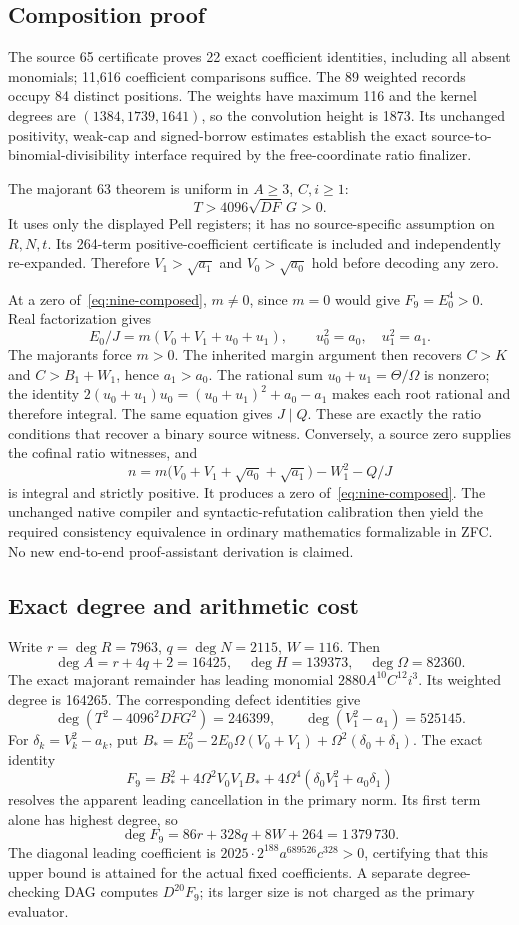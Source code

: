 \subsection{Composition proof}
The source 65 certificate proves 22 exact coefficient identities, including
all absent monomials; 11,616 coefficient comparisons suffice. The 89 weighted
records occupy 84 distinct positions. The weights have maximum 116 and the
kernel degrees are $(1384,1739,1641)$, so the convolution height is 1873.
Its unchanged positivity, weak-cap and signed-borrow estimates establish
the exact source-to-binomial-divisibility interface required by the
free-coordinate ratio finalizer.

The majorant 63 theorem is uniform in $A\ge3$, $C,i\ge1$:
\[
 T>4096\sqrt{DF}\,G>0.
\]
It uses only the displayed Pell registers; it has no source-specific
assumption on $R,N,t$. Its 264-term positive-coefficient certificate is
included and independently re-expanded. Therefore $V_1>\sqrt{a_1}$ and
$V_0>\sqrt{a_0}$ hold before decoding any zero.

At a zero of~\eqref{eq:nine-composed}, $m\ne0$, since $m=0$ would give
$F_9=E_0^4>0$. Real factorization gives
\[
 E_0/J=m(V_0+V_1+u_0+u_1),\qquad u_0^2=a_0,\quad u_1^2=a_1.
\]
The majorants force $m>0$. The inherited margin argument then recovers
$C>K$ and $C>B_1+W_1$, hence $a_1>a_0$. The rational sum
$u_0+u_1=\Theta/\Omega$ is nonzero; the identity
$2(u_0+u_1)u_0=(u_0+u_1)^2+a_0-a_1$ makes each root rational and therefore
integral. The same equation gives $J\mid Q$. These are exactly the ratio
conditions that recover a binary source witness. Conversely, a source zero
supplies the cofinal ratio witnesses, and
\[
 n=m\bigl(V_0+V_1+\sqrt{a_0}+\sqrt{a_1}\bigr)-W_1^2-Q/J
\]
is integral and strictly positive. It produces a zero of~\eqref{eq:nine-composed}.
The unchanged native compiler and syntactic-refutation calibration then yield
the required consistency equivalence in ordinary mathematics formalizable
in ZFC. No new end-to-end proof-assistant derivation is claimed.

\subsection{Exact degree and arithmetic cost}
Write $r=\deg R=7963$, $q=\deg N=2115$, $W=116$. Then
\[
 \deg A=r+4q+2=16425,\quad\deg H=139373,\quad\deg\Omega=82360.
\]
The exact majorant remainder has leading monomial
$2880A^{10}C^{12}i^3$. Its weighted degree is 164265. The corresponding
defect identities give
\[
 \deg(T^2-4096^2DFG^2)=246399,\qquad
 \deg(V_1^2-a_1)=525145.
\]
For $\delta_k=V_k^2-a_k$, put
$B_*=E_0^2-2E_0\Omega(V_0+V_1)+\Omega^2(\delta_0+\delta_1)$.
The exact identity
\[
 F_9=B_*^2+4\Omega^2V_0V_1B_*
                  +4\Omega^4(\delta_0V_1^2+a_0\delta_1)
\]
resolves the apparent leading cancellation in the primary norm. Its first
term alone has highest degree, so
\[
 \deg F_9=86r+328q+8W+264=1\,379\,730.
\]
The diagonal leading coefficient is
$2025\cdot2^{188}a^{689526}c^{328}>0$, certifying that this upper bound is
attained for the actual fixed coefficients. A separate degree-checking DAG
computes $D^{20}F_9$; its larger size is not charged as the primary evaluator.

